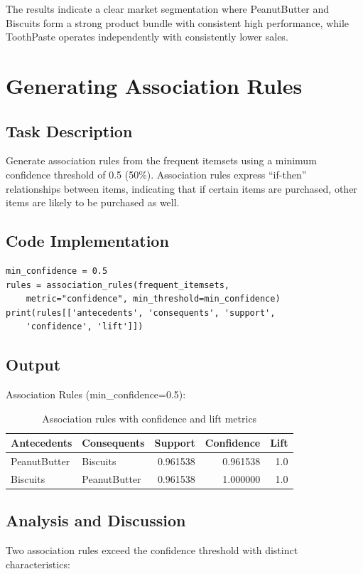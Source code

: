 \documentclass[12pt,a4paper]{article}
\begin{document}
The results indicate a clear market segmentation where PeanutButter and Biscuits form a strong product bundle with consistent high performance, while ToothPaste operates independently with consistently lower sales.



\section{Generating Association Rules}

\subsection{Task Description}
Generate association rules from the frequent itemsets using a minimum confidence threshold of 0.5 (50\%). Association rules express ``if-then'' relationships between items, indicating that if certain items are purchased, other items are likely to be purchased as well.

\subsection{Code Implementation}

\begin{lstlisting}
min_confidence = 0.5
rules = association_rules(frequent_itemsets, 
    metric="confidence", min_threshold=min_confidence)
print(rules[['antecedents', 'consequents', 'support', 
    'confidence', 'lift']])
\end{lstlisting}

\subsection{Output}
Association Rules (min\_confidence=0.5):
\begin{table}[H]
\centering
\small
\begin{tabular}{l|l|r|r|r}
\toprule
\textbf{Antecedents} & \textbf{Consequents} & \textbf{Support} & \textbf{Confidence} & \textbf{Lift} \\
\midrule
PeanutButter & Biscuits & 0.961538 & 0.961538 & 1.0 \\
Biscuits & PeanutButter & 0.961538 & 1.000000 & 1.0 \\
\bottomrule
\end{tabular}
\caption{Association rules with confidence and lift metrics}
\end{table}

\subsection{Analysis and Discussion}
Two association rules exceed the confidence threshold with distinct characteristics:
\end{document}
